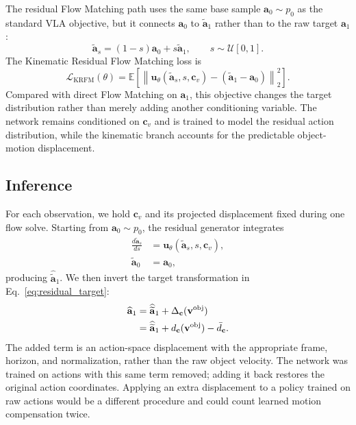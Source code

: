 \documentclass[10pt,twocolumn,letterpaper]{article}
\begin{document}
The residual Flow Matching path uses the same base sample $\mathbf a_0\sim p_0$
as the standard VLA objective, but it connects $\mathbf a_0$ to
$\widetilde{\mathbf a}_1$ rather than to the raw target $\mathbf a_1$:
\[
    \widetilde{\mathbf a}_s
    =
    (1-s)\mathbf a_0+s\widetilde{\mathbf a}_1,
    \qquad
    s\sim\mathcal U[0,1].
\]
The Kinematic Residual Flow Matching loss is
\begin{equation}
    \mathcal L_{\mathrm{KRFM}}(\theta)
    =
    \mathbb E
    \left[
        \left\|
            \mathbf u_\theta(\widetilde{\mathbf a}_s,s,\mathbf c_v)
            -
            (\widetilde{\mathbf a}_1-\mathbf a_0)
        \right\|_2^2
    \right].
    \label{eq:krfm_loss}
\end{equation}
Compared with direct Flow Matching on $\mathbf a_1$, this objective changes the
target distribution rather than merely adding another conditioning variable. The
network remains conditioned on $\mathbf c_v$ and is trained to model the residual action distribution, while the
kinematic branch accounts for the predictable object-motion displacement.

\subsection{Inference}
\label{subsec:inference}

For each observation, we hold $\mathbf c_v$ and its projected displacement
fixed during one flow solve. Starting from $\mathbf a_0\sim p_0$, the
residual generator integrates
\begin{align}
    \frac{d\widetilde{\mathbf a}_s}{ds}
    &=\mathbf u_\theta(\widetilde{\mathbf a}_s,s,\mathbf c_v), \\
    \widetilde{\mathbf a}_0&=\mathbf a_0,
\end{align}
producing $\widehat{\widetilde{\mathbf a}}_1$. We then invert the target
transformation in Eq.~\ref{eq:residual_target}:
\begin{align}
    \widehat{\mathbf a}_1
    &=\widehat{\widetilde{\mathbf a}}_1
      +\Delta_{\mathbf c}(\mathbf v^{\mathrm{obj}}) \notag\\
    &=\widehat{\widetilde{\mathbf a}}_1
      +d_{\mathbf c}(\mathbf v^{\mathrm{obj}})-\bar d_{\mathbf c}.
    \label{eq:residual_to_raw_inference}
\end{align}
The added term is an action-space displacement with the appropriate frame,
horizon, and normalization, rather than the raw object velocity.
The network was trained on actions with this same term removed; adding it
back restores the original action coordinates. Applying an extra displacement
to a policy trained on raw actions would be a different procedure and could
count learned motion compensation twice.
\end{document}
